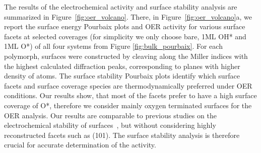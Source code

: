 %
%
The results of the electrochemical activity and surface stability analysis are summarized in Figure~\ref{fig:oer_volcano}.
%
There, in Figure~\ref{fig:oer_volcano}a, we report the surface energy Pourbaix plots and OER activity for various surface facets at selected coverages (for simplicity we only choose bare, 1ML OH* and 1ML O*) of all four systems from Figure \ref{fig:bulk_pourbaix}. For each polymorph, surfaces were constructed by cleaving along the Miller indices with the highest calculated  diffraction peaks, corresponding to planes with higher density of atoms.    
%
The surface stability Pourbaix plots identify which surface facets and surface coverage species are thermodynamically preferred under OER conditions. Our results show, that most of the facets prefer to have a high surface coverage of O*, therefore we consider mainly oxygen terminated surfaces for the OER analysis. Our results are comparable to previous studies on the electrochemical stability of \IrOtwo surfaces~\cite{Nattino2019,raman_surface_2020},
but without considering highly reconstructed facets such as (101).
The surface stability analysis is therefore crucial for accurate determination of the activity.
%


